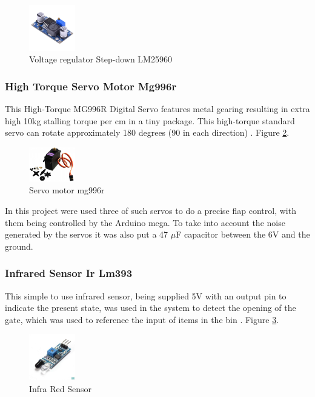 \documentclass[a4paper,11pt]{article}
\begin{document}
\begin{figure}[H]
  \centering
  \includegraphics[width=2cm]{Figures/voltageRegulator.jpg}
  \caption{\small{Voltage regulator Step-down LM25960}}
  \label{fig:VoltageRegulator}
\end{figure}

\subsubsection{High Torque Servo Motor Mg996r}
\label{subsubsec:servomotor}
This High-Torque MG996R Digital Servo features metal gearing resulting in extra high 10kg stalling torque per cm in a tiny package. This high-torque standard servo can rotate approximately 180 degrees (90 in each direction) \cite{servo}. Figure \ref{fig:servo}.

\begin{figure}[H]
  \centering
  \includegraphics[width=2cm]{Figures/servo-motor-mg996r-tower-pro-360-11kgcm-rotacao-continua-com-engrenagens-metalicas.jpg}
  \caption{\small{Servo motor mg996r}}
  \label{fig:servo}
\end{figure}

In this project were used three of such servos to do a precise flap control, with them being controlled by the Arduino mega. To take into account the noise generated by the servos it was also put a 47 $\mu$F capacitor between the 6V and the ground.

\subsubsection{Infrared Sensor Ir Lm393}
\label{subsubsec:irsensor}
This simple to use infrared sensor, being supplied 5V with an output pin to indicate the present state, was used in the system to detect the opening of the gate, which was used to reference the input of items in the bin \cite{irsensor}. Figure \ref{fig:ir}.

\begin{figure}[H]
  \centering
  \includegraphics[width=2cm]{Figures/infraRed_sensor.jpg}
  \caption{\small{Infra Red Sensor}}
  \label{fig:ir}
\end{figure}
\end{document}
